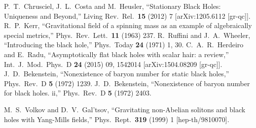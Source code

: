 \begin{small}
\begin{thebibliography}{99}
  P.~T.~Chrusciel, J.~L.~Costa and M.~Heusler,
  ``Stationary Black Holes: Uniqueness and Beyond,''
  Living Rev.\ Rel.\  {\bf 15} (2012) 7
  [arXiv:1205.6112 [gr-qc]].
  R.~P.~Kerr,
  ``Gravitational field of a spinning mass as an example of algebraically special metrics,''
  Phys.\ Rev.\ Lett.\  {\bf 11} (1963) 237.
  R.~Ruffini and J.~A.~Wheeler,
  ``Introducing the black hole,''
  Phys.\ Today {\bf 24} (1971) 1,  30.
  C.~A.~R.~Herdeiro and E.~Radu,
  ``Asymptotically flat black holes with scalar hair: a review,''
  Int.\ J.\ Mod.\ Phys.\ D {\bf 24} (2015) 09,  1542014
  [arXiv:1504.08209 [gr-qc]].
  J.~D.~Bekenstein,
  ``Nonexistence of baryon number for static black holes,''
  Phys.\ Rev.\ D {\bf 5} (1972) 1239.
  J.~D.~Bekenstein,
  ``Nonexistence of baryon number for black holes. ii,''
  Phys.\ Rev.\ D {\bf 5} (1972) 2403.
  
  M.~S.~Volkov and D.~V.~Gal'tsov,
  ``Gravitating non-Abelian solitons and black holes with Yang-Mills fields,''
  Phys.\ Rept.\  {\bf 319} (1999) 1
  [hep-th/9810070].


\end{thebibliography}
\end{small}
